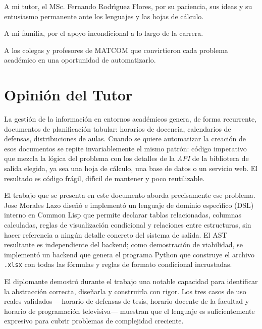 \documentclass[12pt,a4paper]{report}
\theoremstyle{defstyle}
\newcommand{\xlsx}{\texttt{.xlsx}}
\begin{document}
A mi tutor, el MSc. Fernando Rodr\'{\i}guez Flores, por su paciencia, sus ideas
y su entusiasmo permanente ante los lenguajes y las hojas de c\'alculo.

A mi familia, por el apoyo incondicional a lo largo de la carrera.

A los colegas y profesores de MATCOM que convirtieron cada problema
acad\'emico en una oportunidad de automatizarlo.

\newpage

\chapter*{Opini\'on del Tutor}
\thispagestyle{plain}

La gesti\'on de la informaci\'on en entornos acad\'emicos genera, de forma
recurrente, documentos de planificaci\'on tabular: horarios de docencia,
calendarios de defensas, distribuciones de aulas.  Cuando se quiere automatizar
la creaci\'on de esos documentos se repite invariablemente el mismo patr\'on:
c\'odigo imperativo que mezcla la l\'ogica del problema con los detalles de
la \textit{API} de la biblioteca de salida elegida, ya sea una hoja de c\'alculo,
una base de datos o un servicio web.  El resultado es c\'odigo fr\'agil,
dif\'{\i}cil de mantener y poco reutilizable.

El trabajo que se presenta en este documento aborda precisamente ese problema.
Jose Morales Lazo dise\~n\'o e implement\'o un lenguaje de dominio espec\'{\i}fico
(DSL) interno en Common Lisp que permite declarar tablas relacionadas, columnas
calculadas, reglas de visualizaci\'on condicional y relaciones entre estructuras,
sin hacer referencia a ning\'un detalle concreto del sistema de salida.
El AST resultante es independiente del backend; como demostraci\'on de
viabilidad, se implement\'o un backend que genera el programa Python que
construye el archivo \xlsx{} con todas las f\'ormulas y reglas de formato
condicional incrustadas.

El diplomante demostr\'o durante el trabajo una notable capacidad para
identificar la abstracci\'on correcta, dise\~narla y construirla con rigor.
Los tres casos de uso reales validados ---horario de defensas de tesis,
horario docente de la facultad y horario de programaci\'on televisiva---
muestran que el lenguaje es suficientemente expresivo para cubrir problemas
de complejidad creciente.
\end{document}
